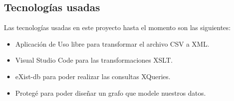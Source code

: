 \documentclass[../main.tex]{subfiles}
\begin{document}
\subsection{Tecnologías usadas}
Las tecnologías usadas en este proyecto hasta el momento son las siguientes:
\begin{itemize}
    \item Aplicación de Uso libre para transformar el archivo CSV a XML.
    \item Visual Studio Code para las transformaciones XSLT.
    \item eXist-db para poder realizar las consultas XQueries.
    \item Protegé para poder diseñar un grafo que modele nuestros datos.
\end{itemize}
\end{document}
